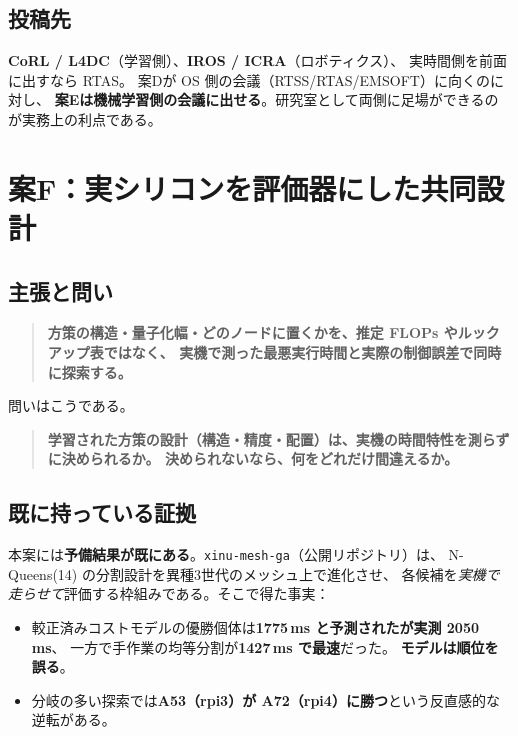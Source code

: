 \documentclass[11pt,a4paper]{article}
\newcommand{\code}[1]{\texttt{#1}}
\newcommand{\prob}[1]{\textbf{\textcolor{red!55!black}{#1}}}
\newcommand{\keyp}[1]{\textbf{\textcolor{blue!45!black}{#1}}}
\begin{document}
\subsection{投稿先}

\keyp{CoRL / L4DC}（学習側）、\keyp{IROS / ICRA}（ロボティクス）、
実時間側を前面に出すなら RTAS。
案Dが OS 側の会議（RTSS/RTAS/EMSOFT）に向くのに対し、
\keyp{案Eは機械学習側の会議に出せる}。研究室として両側に足場ができるのが実務上の利点である。

\section{案F：実シリコンを評価器にした共同設計}
\label{sec:planF}

\subsection{主張と問い}

\begin{quote}
\keyp{方策の構造・量子化幅・どのノードに置くかを、推定 FLOPs やルックアップ表ではなく、
実機で測った最悪実行時間と実際の制御誤差で同時に探索する。}
\end{quote}

\noindent
問いはこうである。

\begin{quote}
\keyp{学習された方策の設計（構造・精度・配置）は、実機の時間特性を測らずに決められるか。
決められないなら、何をどれだけ間違えるか。}
\end{quote}

\subsection{既に持っている証拠}

本案には\keyp{予備結果が既にある}。\code{xinu-mesh-ga}（公開リポジトリ）は、
N-Queens(14) の分割設計を異種3世代のメッシュ上で進化させ、
各候補を\emph{実機で走らせて}評価する枠組みである。そこで得た事実：

\begin{itemize}[leftmargin=1.4em,itemsep=2pt]
  \item 較正済みコストモデルの優勝個体は\keyp{1775\,ms と予測されたが実測 2050\,ms}、
        一方で手作業の均等分割が\keyp{1427\,ms で最速}だった。
        \prob{モデルは順位を誤る}。
  \item 分岐の多い探索では\keyp{A53（rpi3）が A72（rpi4）に勝つ}という反直感的な逆転がある。
\end{itemize}
\end{document}
